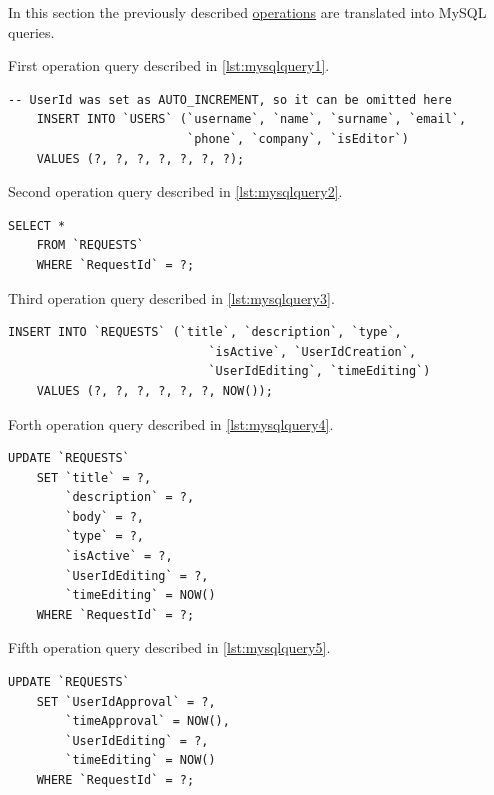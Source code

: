 \documentclass[12pt, a4paper]{report}
\begin{document}
In this section the previously described \hyperref[subsec:ops]{operations} are translated into MySQL queries.

First operation query described in \autoref{lst:mysqlquery1}.

\begin{lstlisting}[language=MySQL, caption={op. 1}, label={lst:mysqlquery1}]
    -- UserId was set as AUTO_INCREMENT, so it can be omitted here
    INSERT INTO `USERS` (`username`, `name`, `surname`, `email`,
                         `phone`, `company`, `isEditor`)
    VALUES (?, ?, ?, ?, ?, ?, ?);
\end{lstlisting}

Second operation query described in \autoref{lst:mysqlquery2}.

\begin{lstlisting}[language=MySQL, caption={op. 2}, label={lst:mysqlquery2}]
    SELECT *
    FROM `REQUESTS`
    WHERE `RequestId` = ?;
\end{lstlisting}

Third operation query described in \autoref{lst:mysqlquery3}.

\begin{lstlisting}[language=MySQL, caption={op. 3}, label={lst:mysqlquery3}]
    INSERT INTO `REQUESTS` (`title`, `description`, `type`,
                            `isActive`, `UserIdCreation`,
                            `UserIdEditing`, `timeEditing`)
    VALUES (?, ?, ?, ?, ?, ?, NOW());
\end{lstlisting}

Forth operation query described in \autoref{lst:mysqlquery4}.

\begin{lstlisting}[language=MySQL, caption={op. 4}, label={lst:mysqlquery4}]
    UPDATE `REQUESTS`
    SET `title` = ?,
        `description` = ?,
        `body` = ?,
        `type` = ?,
        `isActive` = ?,
        `UserIdEditing` = ?,
        `timeEditing` = NOW()
    WHERE `RequestId` = ?;
\end{lstlisting}

Fifth operation query described in \autoref{lst:mysqlquery5}.

\begin{lstlisting}[language=MySQL, caption={op. 5}, label={lst:mysqlquery5}]
    UPDATE `REQUESTS`
    SET `UserIdApproval` = ?,
        `timeApproval` = NOW(),
        `UserIdEditing` = ?,
        `timeEditing` = NOW()
    WHERE `RequestId` = ?;
\end{lstlisting}
\end{document}
